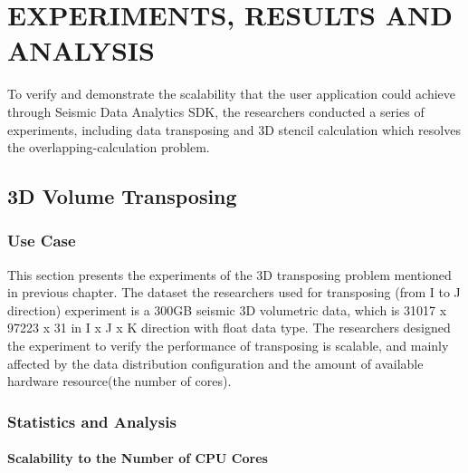 %
%
%


\chapter{\uppercase{Experiments, Results and Analysis}}

To verify and demonstrate the scalability that the user application could achieve through Seismic Data Analytics SDK, the researchers conducted a series of experiments, including data transposing and 3D stencil calculation which resolves the overlapping-calculation problem. 

\section{3D Volume Transposing}

\subsection{Use Case}

This section presents the experiments of the 3D transposing problem mentioned in previous chapter. The dataset the researchers used for transposing (from I  to J direction) experiment is a 300GB seismic 3D volumetric data, which is 31017 x 97223 x 31 in I x J x K direction with float data type. 
The researchers designed the experiment to verify the performance of transposing is scalable, and mainly affected by the data distribution configuration and the amount of available hardware resource(the number of cores).

\subsection{Statistics and Analysis}

\subsubsection{Scalability to the Number of CPU Cores}

